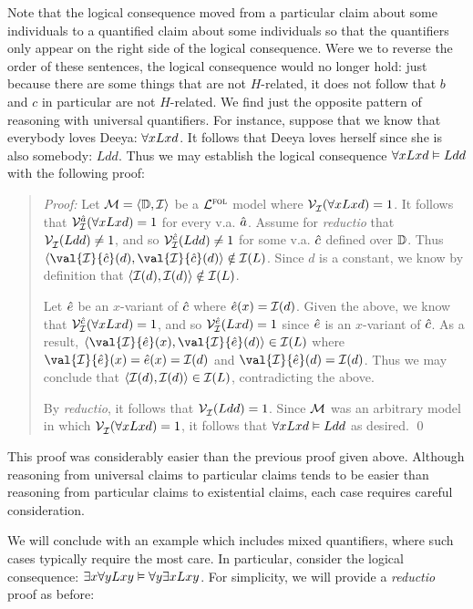 Note that the logical consequence moved from a particular claim about some individuals to a quantified claim about some individuals so that the quantifiers only appear on the right side of the logical consequence.
Were we to reverse the order of these sentences, the logical consequence would no longer hold: just because there are some things that are not $H$-related, it does not follow that $b$ and $c$ in particular are not $H$-related. 
We find just the opposite pattern of reasoning with universal quantifiers.
For instance, suppose that we know that everybody loves Deeya: $\forall xLxd$.
It follows that Deeya loves herself since she is also somebody: $Ldd$.
Thus we may establish the logical consequence $\forall xLxd \vDash Ldd$ with the following proof: 

\begin{quote}
\label{allmodels5}
  \textit{Proof:}
  Let $\mathcal{M}=\langle\mathbb{D},\mathcal{I}\rangle$ be a $\mathcal{L}^{\textsc{fol}}$ model where $\mathcal{V}_{\mathcal{I}}^{}(\forall xLxd)=1$.
  It follows that $\mathcal{V}_{\mathcal{I}}^{\hat{a}}(\forall xLxd)=1$ for every v.a. $\hat{a}$. %
  Assume for \textit{reductio} that $\mathcal{V}_{\mathcal{I}}^{}(Ldd) \neq 1$, and so $\mathcal{V}_{\mathcal{I}}^{\hat{c}}(Ldd) \neq 1$ for some v.a. $\hat{c}$ defined over $\mathbb{D}$.
  Thus $\tuple{\val{\I}{\va{c}}(d),\val{\I}{\va{c}}(d)}\notin\I(L)$.
  Since $d$ is a constant, we know by definition that $\langle\mathcal{I}(d),\mathcal{I}(d)\rangle \notin \mathcal{I}(L)$. 

  Let $\hat{e}$ be an $x$-variant of $\hat{c}$ where $\hat{e}(x) = \mathcal{I}(d)$.
  Given the above, we know that $\mathcal{V}_{\mathcal{I}}^{\hat{c}}(\forall xLxd) = 1$, and so $\mathcal{V}_{\mathcal{I}}^{\hat{e}}(Lxd)=1$ since $\hat{e}$ is an $x$-variant of $\hat{c}$.
  As a result, $\tuple{\val{\I}{\va{e}}(x),\val{\I}{\va{e}}(d)}\in\I(L)$ where $\val{\I}{\va{e}}(x)=\va{e}(x)=\I(d)$ and $\val{\I}{\va{e}}(d) = \I(d)$.
  Thus we may conclude that $\langle\mathcal{I}(d),\mathcal{I}(d)\rangle\in\mathcal{I}(L)$, contradicting the above.

  By \textit{reductio}, it follows that $\mathcal{V}_{\mathcal{I}}^{}(Ldd) = 1$.
  Since $\mathcal{M}$ was an arbitrary model in which $\mathcal{V}_{\mathcal{I}}^{}(\forall xLxd)=1$, it follows that $\forall xLxd \vDash Ldd$ as desired.
  \qed
\end{quote}

This proof was considerably easier than the previous proof given above.
Although reasoning from universal claims to particular claims tends to be easier than reasoning from particular claims to existential claims, each case requires careful consideration.

We will conclude with an example which includes mixed quantifiers, where such cases typically require the most care.
In particular, consider the logical consequence: $\exists x\forall yLxy \vDash \forall y\exists xLxy$.
For simplicity, we will provide a \textit{reductio} proof as before:

